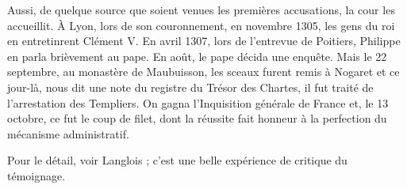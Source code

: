 \documentclass[french,twoside]{book} %
\begin{document}
\label{p54} Aussi, de quelque source que soient venues les premières accusations, la cour les accueillit. À Lyon, lors de son couronnement, en novembre 1305, les gens du roi en entretinrent Clément V. En avril 1307, lors de l’entrevue de Poitiers, Philippe en parla brièvement au pape. En août, le pape décida une enquête. Mais le 22 septembre, au monastère de Maubuisson, les sceaux furent remis à Nogaret et ce jour-là, nous dit une note du registre du Trésor des Chartes, il fut traité de l’arrestation des Templiers. On gagna l’Inquisition générale de France et, le 13 octobre, ce fut le coup de filet, dont la réussite fait honneur à la perfection du mécanisme administratif.\par
Pour le détail, voir Langlois ; c’est une belle expérience de critique du témoignage.\par
\end{document}
